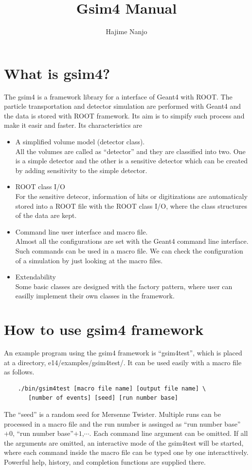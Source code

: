 \documentclass[a4paper,12pt]{article}
\begin{document}
\title{Gsim4 Manual}
\author{Hajime Nanjo}
\maketitle
 \section{What is gsim4?}
 The gsim4 is a framework library for a interface of Geant4 with 
 ROOT. The particle transportation and detector simulation are performed
 with Geant4 and the data is stored with ROOT framework.
 Its aim is to simpify such process and make it easir and
 faster. Its characteristics are 
 \begin{itemize}
  \item A simplified volume model (detector class).\\
	All the volumes are called as ``detector'' and they are
	classified into two. One is a simple detector and the other is
	a sensitive detector which can be created by adding sensitivity
 	to the simple detector.
  \item ROOT class I/O\\
	For the sensitive detecor, information
	of hits or digitizations are automaticaly stored into a ROOT
	file with the ROOT class I/O, where the class structures of the
	data are kept.
  \item Command line user interface and macro file.\\
	Almost all the configurations are set with
	the Geant4 command line interface. Such commands can be used in
	a macro file. We can check the configuration of a simulation by
	just looking at the macro files.
  \item Extendability\\
	Some basic classes are designed with the factory pattern, where
	user can easilly implement their own classes in the framework. 
 \end{itemize}
 \section{How to use gsim4 framework}
 An example program using the gsim4 framework is ``gsim4test'',
 which is placed at a directory, e14/examples/gsim4test/.
 It can be used easily with a macro file as follows.
 \begin{screen}
   \begin{verbatim}
	./bin/gsim4test [macro file name] [output file name] \
	   [number of events] [seed] [run number base]\end{verbatim}  
 \end{screen}
 The ``seed'' is a random seed for Mersenne Twister. Multiple runs can
 be processed in a macro file and the run number is
 assinged as ``run number base''$+0$, ``run number base''$+1$,$\cdots$.
 Each command line argument can be omitted. If all the arguments are
 omitted, an interactive mode of the gsim4test will be started, where
 each command inside the macro file can be typed one by one
 interacttively. Powerful help, history, and completion functions are
 supplied there.
\end{document}
